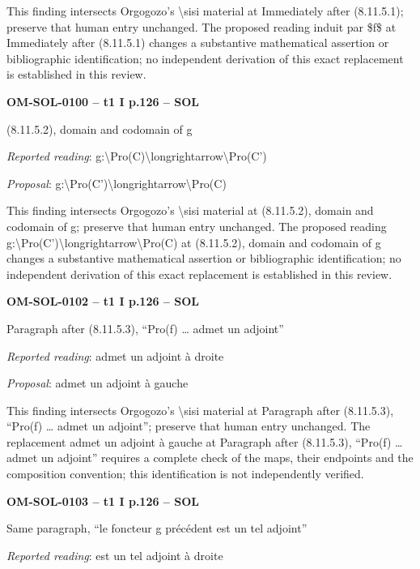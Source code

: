 This finding intersects Orgogozo's \textbackslash{}sisi material at Immediately after (8.11.5.1); preserve that human entry unchanged. The proposed reading induit par \$f\$ at Immediately after (8.11.5.1) changes a substantive mathematical assertion or bibliographic identification; no independent derivation of this exact replacement is established in this review.\par
\par\noindent\textbf{OM-SOL-0100 -- t1 I p.126 -- SOL}\par
(8.11.5.2), domain and codomain of g\par
\emph{Reported reading}: g:\textbackslash{}Pro(C)\textbackslash{}longrightarrow\textbackslash{}Pro(C')\par
\emph{Proposal}: g:\textbackslash{}Pro(C')\textbackslash{}longrightarrow\textbackslash{}Pro(C)\par
This finding intersects Orgogozo's \textbackslash{}sisi material at (8.11.5.2), domain and codomain of g; preserve that human entry unchanged. The proposed reading g:\textbackslash{}Pro(C')\textbackslash{}longrightarrow\textbackslash{}Pro(C) at (8.11.5.2), domain and codomain of g changes a substantive mathematical assertion or bibliographic identification; no independent derivation of this exact replacement is established in this review.\par
\par\noindent\textbf{OM-SOL-0102 -- t1 I p.126 -- SOL}\par
Paragraph after (8.11.5.3), “Pro(f) … admet un adjoint”\par
\emph{Reported reading}: admet un adjoint à droite\par
\emph{Proposal}: admet un adjoint à gauche\par
This finding intersects Orgogozo's \textbackslash{}sisi material at Paragraph after (8.11.5.3), “Pro(f) … admet un adjoint”; preserve that human entry unchanged. The replacement admet un adjoint à gauche at Paragraph after (8.11.5.3), “Pro(f) … admet un adjoint” requires a complete check of the maps, their endpoints and the composition convention; this identification is not independently verified.\par
\par\noindent\textbf{OM-SOL-0103 -- t1 I p.126 -- SOL}\par
Same paragraph, “le foncteur g précédent est un tel adjoint”\par
\emph{Reported reading}: est un tel adjoint à droite\par
